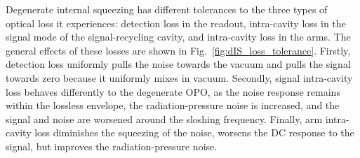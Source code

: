 Degenerate internal squeezing has different tolerances to the three types of optical loss it experiences: detection loss in the readout, intra-cavity loss in the signal mode of the signal-recycling cavity, and intra-cavity loss in the arms. %
The general effects of these losses are shown in Fig.~\ref{fig:dIS_loss_tolerance}. Firstly, detection loss uniformly pulls the noise towards the vacuum and pulls the signal towards zero because it uniformly mixes in vacuum. Secondly, signal intra-cavity loss behaves differently to the degenerate OPO, as the noise response remains within the lossless envelope, the radiation-pressure noise is increased, and the signal and noise are worsened around the sloshing frequency. Finally, arm intra-cavity loss diminishes the squeezing of the noise, worsens the DC response to the signal, but improves the radiation-pressure noise.

